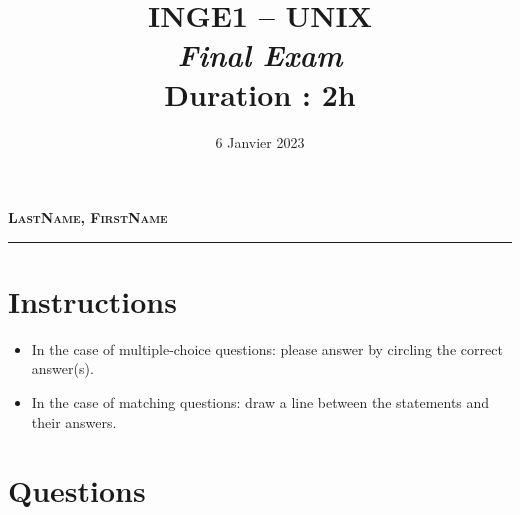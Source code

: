 \documentclass[11pt,a4paper]{article}
\title{\textsc{INGE1 -- UNIX}\\
    \emph{Final Exam} \\
    Duration : 2h
}
\date{6 Janvier 2023}
\begin{document}
\maketitle

\thispagestyle{empty}
\begin{figure}[!h]
    \centering
\end{figure}

\vfill
{\noindent\Large \textbf{\textsc{LastName, FirstName}}}\\[1cm]
\rule{0.8\textwidth}{1pt}

\vfill
\noindent{}
\newpage

\section*{Instructions}
\begin{itemize}
    \item In the case of multiple-choice questions: please answer by 
          circling the correct answer(s). 
    \item In the case of matching questions: draw a line between the 
          statements and their answers. 
\end{itemize}
\section*{Questions}
\end{document}
